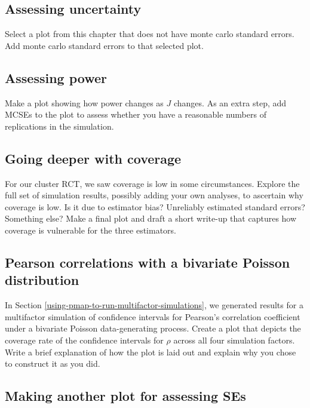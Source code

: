 \documentclass[
]{book}
\begin{document}
\subsection{Assessing uncertainty}\label{assessing-uncertainty}

Select a plot from this chapter that does not have monte carlo standard errors.
Add monte carlo standard errors to that selected plot.

\subsection{Assessing power}\label{assessing-power}

Make a plot showing how power changes as \(J\) changes.
As an extra step, add MCSEs to the plot to assess whether you have a reasonable numbers of replications in the simulation.

\subsection{Going deeper with coverage}\label{going-deeper-with-coverage}

For our cluster RCT, we saw coverage is low in some circumstances.
Explore the full set of simulation results, possibly adding your own analyses, to ascertain why coverage is low.
Is it due to estimator bias? Unreliably estimated standard errors? Something else?
Make a final plot and draft a short write-up that captures how coverage is vulnerable for the three estimators.

\subsection{Pearson correlations with a bivariate Poisson distribution}\label{pearson-correlations-with-a-bivariate-poisson-distribution}

In Section \ref{using-pmap-to-run-multifactor-simulations}, we generated results for a multifactor simulation of confidence intervals for Pearson's correlation coefficient under a bivariate Poisson data-generating process. Create a plot that depicts the coverage rate of the confidence intervals for \(\rho\) across all four simulation factors.
Write a brief explanation of how the plot is laid out and explain why you chose to construct it as you did.

\subsection{Making another plot for assessing SEs}\label{making-another-plot-for-assessing-ses}
\end{document}
